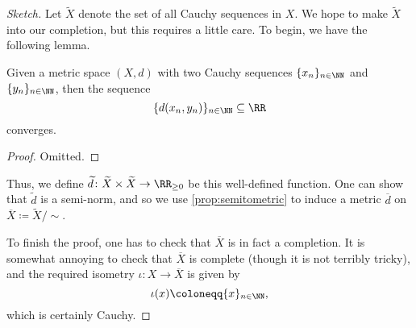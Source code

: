 \documentclass[../notes.tex]{subfiles}
\begin{document}
\begin{proof}[Sketch]
	Let $\widetilde X$ denote the set of all Cauchy sequences in $X$. We hope to make $\widetilde X$ into our completion, but this requires a little care. To begin, we have the following lemma.
	\begin{lemma}
		Given a metric space $(X,d)$ with two Cauchy sequences $\{x_n\}_{n\in\NN}$ and $\{y_n\}_{n\in\NN}$, then the sequence
		\[\{d(x_n,y_n)\}_{n\in\NN}\subseteq\RR\]
		converges.
	\end{lemma}
	\begin{proof}
		Omitted.
	\end{proof}
	Thus, we define $\widetilde d\colon\widetilde X\times\widetilde X\to\RR_{\ge0}$ be this well-defined function. One can show that $\widetilde d$ is a semi-norm, and so we use \autoref{prop:semitometric} to induce a metric $\overline d$ on $\overline X\coloneqq\widetilde X/{\sim}$.
	
	To finish the proof, one has to check that $\overline X$ is in fact a completion. It is somewhat annoying to check that $\overline X$ is complete (though it is not terribly tricky), and the required isometry $\iota\colon X\to\overline X$ is given by
	\[\iota(x)\coloneqq\{x\}_{n\in\NN},\]
	which is certainly Cauchy.
\end{proof}
\end{document}
